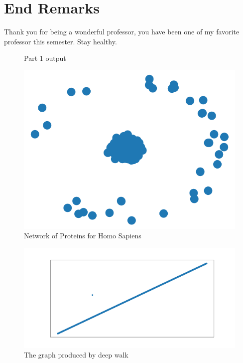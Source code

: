 \documentclass{article}
\begin{document}
\\
\\
\\
\section{End Remarks}
Thank you for being a wonderful professor, you have been one of my favorite professor this semester. Stay healthy.

\pagebreak


\begin{figure}
    \centering
    
    \caption{Part 1 output}
    \label{fig:part1output}
\end{figure}


\begin{figure}
  \includegraphics[width=\textwidth,height=\textheight,keepaspectratio]{protein_network.png}
  \caption{Network of Proteins for Homo Sapiens}
  \label{fig:part1display}
\end{figure}

\begin{figure}
    \centering
    \includegraphics[width=\textwidth,height=\textheight,keepaspectratio]{deepwalk_graph.png}
    \caption{The graph produced by deep walk}
    \label{fig:part3deepwalkgraph}
\end{figure}
\end{document}

